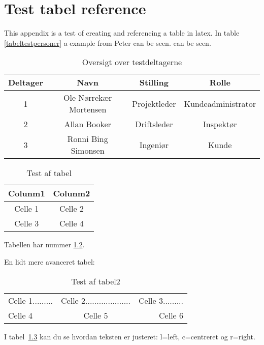 \chapter{Test tabel reference }
\label{appendix:table}

This appendix is a test of creating and referencing a table in latex. In table \ref{tabeltestpersoner} a example from Peter can be seen. can be seen.
\begin{table}[!htbp]
\caption{Oversigt over testdeltagerne}
\begin{tabular}{|c|c|c|c|}
\hline
\textbf{Deltager} & \textbf{Navn} & \textbf{Stilling} & \textbf{Rolle} \\ \hline
1 & Ole Nørrekær Mortensen & Projektleder & Kundeadministrator \\ \hline
2 & Allan Booker & Driftsleder & Inspektør \\ \hline
3 & Ronni Bing Simonsen & Ingeniør & Kunde \\ \hline
\end{tabular}
\label{table:testpersoner}
\end{table}


\begin{table}[!hbt]\caption{Test af tabel}\label{table:test1}
\centering
\begin{tabular}{c|c} \hline
\textbf{Colunm1} & \textbf{Colunm2}\\
\hline
Celle 1 & Celle 2\\
Celle 3 & Celle 4\\
\hline
\end{tabular}
\end{table}

Tabellen har nummer \ref{table:test1}.

En lidt mere avanceret tabel:

\begin{table}[!hbt]\caption{Test af tabel2}\label{table:test2}
\centering\begin{tabular}{| l | c | r |} \hline
Celle 1......... & Celle 2.................... & Celle 3.........\\
Celle 4 & Celle 5 & Celle 6\\
\hline
\end{tabular}
\end{table}
I tabel~\ref{table:test2} kan du se hvordan teksten er justeret: l=left,
c=centreret og r=right.
